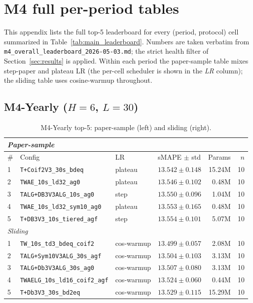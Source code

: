 \documentclass{article}
\begin{document}
\section{M4 full per-period tables}
\label{app:m4_tables}

This appendix lists the full top-5 leaderboard for every (period, protocol) cell summarized in Table~\ref{tab:main_leaderboard}. Numbers are taken verbatim from \texttt{m4\_overall\_leaderboard\_2026-05-03.md}; the strict health filter of Section~\ref{sec:results} is applied. Within each period the paper-sample table mixes step-paper and plateau LR (the per-cell scheduler is shown in the \emph{LR} column); the sliding table uses cosine-warmup throughout.

\subsection{\texorpdfstring{M4-Yearly ($H=6$, $L=30$)}{M4-Yearly (H=6, L=30)}}

\begin{table}[h]
\centering
\scriptsize
\setlength{\tabcolsep}{2.5pt}
\caption{M4-Yearly top-5: paper-sample (left) and sliding (right).}
\label{tab:m4_yearly_full}
\begin{tabular}{@{}llllrr@{}}
\toprule
\multicolumn{6}{l}{\textit{Paper-sample}} \\
\midrule
\# & Config & LR & sMAPE $\pm$ std & Params & $n$ \\
\midrule
1 & \texttt{T+Coif2V3\_30s\_bdeq}           & plateau & $\mathbf{13.542 \pm 0.148}$ & 15.24M & 10 \\
2 & \texttt{TWAE\_10s\_ld32\_ag0}           & plateau & $13.546 \pm 0.102$          & 0.48M  & 10 \\
3 & \texttt{TALG+DB3V3ALG\_10s\_ag0}        & step    & $13.550 \pm 0.096$          & 1.04M  & 10 \\
4 & \texttt{TWAE\_10s\_ld32\_sym10\_ag0}    & plateau & $13.553 \pm 0.165$          & 0.48M  & 10 \\
5 & \texttt{T+DB3V3\_10s\_tiered\_agf}      & step    & $13.554 \pm 0.101$          & 5.07M  & 10 \\
\midrule
\multicolumn{6}{l}{\textit{Sliding}} \\
\midrule
1 & \texttt{TW\_10s\_td3\_bdeq\_coif2}      & cos-warmup & $\mathbf{13.499 \pm 0.057}$ & 2.08M  & 10 \\
2 & \texttt{TALG+Sym10V3ALG\_30s\_agf}      & cos-warmup & $13.504 \pm 0.103$          & 3.13M  & 10 \\
3 & \texttt{TALG+Db3V3ALG\_30s\_ag0}        & cos-warmup & $13.507 \pm 0.080$          & 3.13M  & 10 \\
4 & \texttt{TWAELG\_10s\_ld16\_coif2\_agf}  & cos-warmup & $13.524 \pm 0.060$          & 0.44M  & 10 \\
5 & \texttt{T+Db3V3\_30s\_bd2eq}            & cos-warmup & $13.529 \pm 0.115$          & 15.29M & 10 \\
\bottomrule
\end{tabular}
\end{table}
\end{document}
